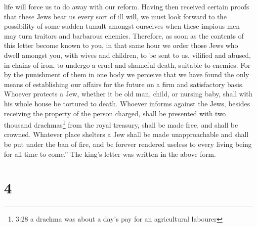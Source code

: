 life will force us to do away with our reform.  Having then
received certain proofs that these Jews bear us every sort of ill will,
we must look forward to the possibility of some sudden tumult amongst
ourselves when these impious men may turn traitors and barbarous
enemies.  Therefore, as soon as the contents of this letter
become known to you, in that same hour we order those Jews who dwell
amongst you, with wives and children, to be sent to us, vilified and
abused, in chains of iron, to undergo a cruel and shameful death,
suitable to enemies.  For by the punishment of them in one
body we perceive that we have found the only means of establishing our
affairs for the future on a firm and satisfactory basis. 
Whoever protects a Jew, whether it be old man, child, or nursing baby,
shall with his whole house be tortured to death.  Whoever
informs against the Jews, besides receiving the property of the person
charged, shall be presented with two thousand drachmas\footnote{3:28 a
  drachma was about a day's pay for an agricultural labourer} from the
royal treasury, shall be made free, and shall be crowned. 
Whatever place shelters a Jew shall be made unapproachable and shall be
put under the ban of fire, and be forever rendered useless to every
living being for all time to come.''  The king's letter was
written in the above form.

\hypertarget{section-3}{%
\section{4}\label{section-3}}

